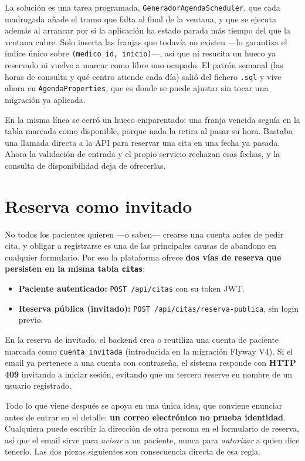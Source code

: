 \documentclass[12pt,a4paper]{report}
\begin{document}
La solución es una tarea programada, \texttt{GeneradorAgendaScheduler}, que cada madrugada añade el tramo que falta al final de la ventana, y que se ejecuta además al arrancar por si la aplicación ha estado parada más tiempo del que la ventana cubre. Solo inserta las franjas que todavía no existen —lo garantiza el índice único sobre \texttt{(medico\_id, inicio)}—, así que ni resucita un hueco ya reservado ni vuelve a marcar como libre uno ocupado. El patrón semanal (las horas de consulta y qué centro atiende cada día) salió del fichero \texttt{.sql} y vive ahora en \texttt{AgendaProperties}, que es donde se puede ajustar sin tocar una migración ya aplicada.

En la misma línea se cerró un hueco emparentado: una franja vencida seguía en la tabla marcada como disponible, porque nada la retira al pasar su hora. Bastaba una llamada directa a la API para reservar una cita en una fecha ya pasada. Ahora la validación de entrada y el propio servicio rechazan esas fechas, y la consulta de disponibilidad deja de ofrecerlas.



\section{Reserva como invitado}

No todos los pacientes quieren —o saben— crearse una cuenta antes de pedir cita, y obligar a registrarse es una de las principales causas de abandono en cualquier formulario. Por eso la plataforma ofrece \textbf{dos vías de reserva que persisten en la misma tabla \texttt{citas}}:

\begin{itemize}
  \item \textbf{Paciente autenticado:} \texttt{POST /api/citas} con su token JWT.
  \item \textbf{Reserva pública (invitado):} \texttt{POST /api/citas/reserva-publica}, sin login previo.
\end{itemize}

En la reserva de invitado, el backend crea o reutiliza una cuenta de paciente marcada como \texttt{cuenta\_invitada} (introducida en la migración Flyway V4). Si el email ya pertenece a una cuenta con contraseña, el sistema responde con \textbf{HTTP 409} invitando a iniciar sesión, evitando que un tercero reserve en nombre de un usuario registrado.

Todo lo que viene después se apoya en una única idea, que conviene enunciar antes de entrar en el detalle: \textbf{un correo electrónico no prueba identidad}. Cualquiera puede escribir la dirección de otra persona en el formulario de reserva, así que el email sirve para \emph{avisar} a un paciente, nunca para \emph{autorizar} a quien dice tenerlo. Las dos piezas siguientes son consecuencia directa de esa regla.
\end{document}
